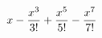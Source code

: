 \documentclass[preview]{standalone}
\begin{document}
\begin{align*}
\special{dvisvgm:raw <g id='unique000'>}x - \frac{x^3}{3!} + \frac{x^5}{5!} - \frac{x^7}{7!}\special{dvisvgm:raw </g>}
\end{align*}
\end{document}
